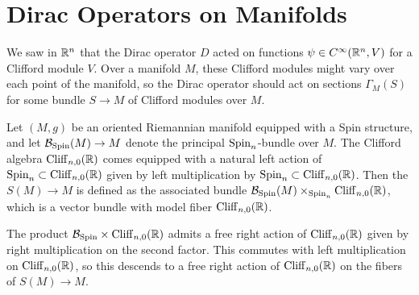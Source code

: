 %
\section{Dirac Operators on Manifolds}
%
We saw in $\mathbb{R}^n$ that the Dirac operator $D$ acted on functions
$\psi \in C^\infty(\mathbb{R}^n, V)$ for a Clifford module $V$. Over a manifold $M$,
these Clifford modules might vary over each point of the manifold, so the
Dirac operator should act on sections $\Gamma_M(S)$ for some bundle $S \to M$
of Clifford modules over $M$.
%
\begin{defn}
Let $(M,g)$ be an oriented Riemannian manifold equipped with a Spin structure,
and let $\mathcal{B}_{\mathrm{Spin}}(M) \to M$ denote the principal $\mathrm{Spin}_n$-bundle over $M$.
The Clifford algebra $\operatorname{Cliff}_{n,0}(\mathbb{R})$ comes equipped with a natural left
action of $\mathrm{Spin}_n \subset \operatorname{Cliff}_{n,0}(\mathbb{R})$ given by left multiplication by
$\mathrm{Spin}_n \subset \operatorname{Cliff}_{n,0}(\mathbb{R})$. Then the  $S(M) \to M$ is
defined as the associated bundle $\mathcal{B}_{\mathrm{Spin}}(M) \times_{\mathrm{Spin}_n} \operatorname{Cliff}_{n,0}(\mathbb{R})$,
which is a vector bundle with model fiber $\operatorname{Cliff}_{n,0}(\mathbb{R})$.
\end{defn}
%
The product $\mathcal{B}_{\mathrm{Spin}} \times \operatorname{Cliff}_{n,0}(\mathbb{R})$ admits a free right action of
$\operatorname{Cliff}_{n,0}(\mathbb{R})$ given by right multiplication on the second factor. This
commutes with left multiplication on $\operatorname{Cliff}_{n,0}(\mathbb{R})$, so this descends to a
free right action of $\operatorname{Cliff}_{n,0}(\mathbb{R})$ on the fibers of $S(M) \to M$.
